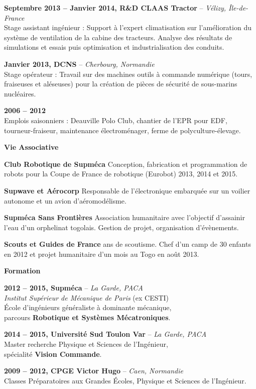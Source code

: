\documentclass[a4paper,11pt,final]{memoir}
\newcommand{\Sep}{\vspace{1.3em}}
\newcommand{\SmallSep}{\vspace{0.5em}}
\newcommand{\CVSection}[1]
	{\Large\textbf{#1}\par
	\SmallSep\normalsize\normalfont}
\newcommand{\CVItem}[2]
	{\textbf{\color{RoyalBlue} #1 \color{dark_gray} #2}\normalsize\normalfont}
\newcommand{\city}[1]
	{{\small\color{dark_gray}\emph{#1}}\normalsize\normalfont}
\begin{document}
\CVItem{Septembre 2013 -- Janvier 2014,}{R\&D CLAAS Tractor} -- \city{Vélizy, Île-de-France}\\
Stage assistant ingénieur : Support à l'expert climatisation sur l'amélioration du système de ventilation de la cabine des tracteurs. Analyse des résultats de simulations et essais puis optimisation et industrialisation des conduits.
\SmallSep

\CVItem{Janvier 2013,}{DCNS} -- \city{Cherbourg, Normandie}\\
Stage opérateur : Travail sur des machines outils à commande numérique (tours, fraiseuses et aléseuses) pour la création de pièces de sécurité de sous-marins nucléaires.
\SmallSep

\CVItem{2006 -- 2012}{}\\
Emplois saisonniers : Deauville Polo Club, chantier de l'EPR pour EDF, tourneur-fraiseur, maintenance électroménager, ferme de polyculture-élevage.
\Sep

\CVSection{Vie Associative}
\CVItem{Club Robotique de Supméca}{}Conception, fabrication et programmation de robots pour la Coupe de France de robotique (Eurobot) 2013, 2014 et 2015.
\SmallSep

\CVItem{Supwave et Aérocorp}{}Responsable de l'électronique embarquée sur un voilier autonome et un avion d'aéromodélisme.
\SmallSep

\CVItem{Supméca Sans Frontières}{}Association humanitaire avec l'objectif d'assainir l'eau d'un orphelinat togolais. Gestion de projet, organisation d'évènements.
\SmallSep

\CVItem{Scouts et Guides de France}{}8 ans de scoutisme. Chef d'un camp de 30 enfants en 2012 et projet humanitaire d'un mois au Togo en août 2013.
\Sep

\CVSection{Formation}

\CVItem{2012 -- 2015,}{Supméca} -- \city{La Garde, PACA}\\
\emph{Institut Supérieur de Mécanique de Paris} (ex CESTI)\\
École d'ingénieurs généraliste à dominante mécanique, \\parcours \textbf{Robotique et Systèmes Mécatroniques}.
\SmallSep

\CVItem{2014 -- 2015,}{Université Sud Toulon Var} -- \city{La Garde, PACA}\\
Master recherche Physique et Sciences de l'Ingénieur,\\ spécialité \textbf{Vision Commande}.
\SmallSep

\CVItem{2009 -- 2012,}{CPGE Victor Hugo} -- \city{Caen, Normandie}\\
Classes Préparatoires aux Grandes Écoles, Physique et Sciences de l'Ingénieur.



\end{document}
